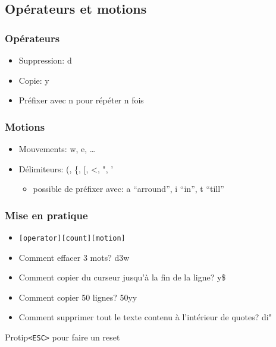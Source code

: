 \documentclass{beamer}
\begin{document}
\subsection{Opérateurs et motions}
\begin{frame} \frametitle{Opérateurs}
  \begin{itemize}
    \item Suppression: d
    \item Copie: y
    \item Préfixer avec n pour répéter n fois
  \end{itemize}
\end{frame}
\begin{frame} \frametitle{Motions}
  \begin{itemize}
    \item Mouvements: w, e, \dots
    \item Délimiteurs: (, \{, [, \textless, ", '
    \begin{itemize}
      \item possible de préfixer avec: a ``arround'', i ``in'', t ``till''
    \end{itemize}
  \end{itemize}
\end{frame}
\begin{frame}[fragile] \frametitle{Mise en pratique}
  \begin{itemize}
    \item \begin{verbatim}[operator][count][motion]\end{verbatim}
  \end{itemize}
  \begin{itemize}
    \item \pause Comment effacer 3 mots? \pause d3w
    \item \pause Comment copier du curseur jusqu'à la fin de la ligne? \pause y\$
    \item \pause Comment copier 50 lignes? \pause 50yy
    \item \pause Comment supprimer tout le texte contenu à l'intérieur de
      quotes? \pause di"
  \end{itemize}
  \pause
  \begin{exampleblock}{Protip}{\tt <ESC>} pour faire un reset\end{exampleblock}
\end{frame}
\end{document}
